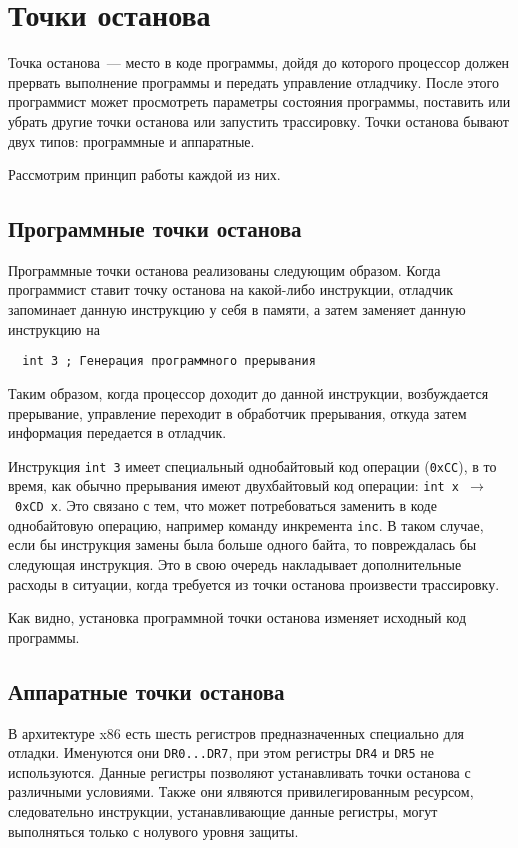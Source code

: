 
\section{Точки останова}
Точка останова~--- место в коде программы, дойдя до которого процессор должен
прервать выполнение программы и передать управление отладчику. После этого
программист может просмотреть параметры состояния программы, поставить или
убрать другие точки останова или запустить трассировку. Точки останова бывают
двух типов: программные и аппаратные.

Рассмотрим принцип работы каждой из них.

\subsection{Программные точки останова}
Программные точки останова реализованы следующим образом. Когда программист
ставит точку останова на какой-либо инструкции, отладчик запоминает данную
инструкцию у себя в памяти, а затем заменяет данную инструкцию на 
\begin{verbatim}
  int 3 ; Генерация программного прерывания
\end{verbatim}
Таким образом, когда процессор доходит до данной инструкции, возбуждается
прерывание, управление переходит в обработчик прерывания, откуда затем
информация передается в отладчик. 

Инструкция \verb!int 3! имеет специальный однобайтовый код операции
(\verb!0xCC!), в то время, как обычно прерывания имеют двухбайтовый код
операции: \verb!int x!~$\to$~\verb!0xCD x!. Это связано с тем, что может
потребоваться заменить в коде однобайтовую операцию, например команду инкремента
\verb!inc!. В таком случае, если бы инструкция замены была больше одного
байта, то повреждалась бы следующая инструкция. Это в свою очередь накладывает
дополнительные расходы в ситуации, когда требуется из точки останова произвести
трассировку.

Как видно, установка программной точки останова изменяет исходный код
программы.

\subsection{Аппаратные точки останова}
В архитектуре x86 есть шесть регистров предназначенных специально для отладки.
Именуются они \verb!DR0...DR7!, при этом регистры \verb!DR4! и \verb!DR5! не
используются. Данные регистры позволяют устанавливать точки останова с
различными условиями. Также они ялвяются привилегированным ресурсом,
следовательно инструкции, устанавливающие данные регистры, могут выполняться
только с нолувого уровня защиты.

